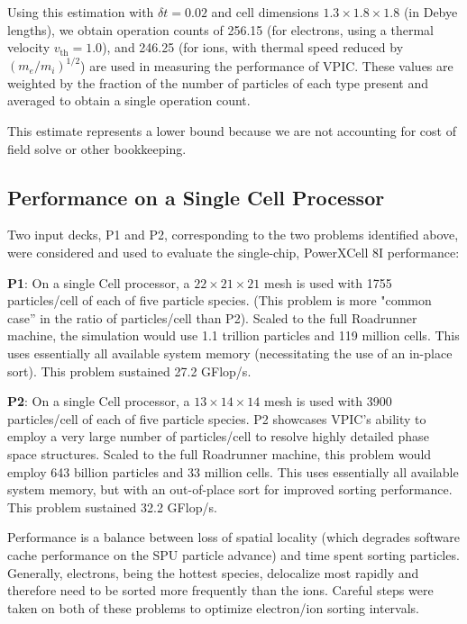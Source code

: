 \documentclass[letter,10pt]{article}
\begin{document}
Using this estimation with $\delta t = 0.02$ and cell dimensions $1.3
\times 1.8 \times 1.8$ (in Debye lengths), we obtain operation counts
of 256.15 (for electrons, using a thermal velocity $v_{\mathrm{th}} =
1.0$), and 246.25 (for ions, with thermal speed reduced by
$(m_e/m_i)^{1/2}$) are used in measuring the performance of VPIC.
These values are weighted by the fraction of the number of particles
of each type present and averaged to obtain a single operation count.

This estimate represents a lower bound because we are not accounting
for cost of field solve or other bookkeeping. 

\subsection{Performance on a Single Cell Processor}

Two input decks, P1 and P2, corresponding to the two problems
identified above, were considered and used to evaluate the
single-chip, PowerXCell 8I performance:

\textbf{P1}:  On a single Cell processor, a $22 \times 21 \times 21$ mesh 
is used with 1755 particles/cell of each of five particle species.
(This problem is more "common case'' in the ratio of particles/cell
than P2).  Scaled to the full Roadrunner machine, the simulation would
use 1.1 trillion particles and 119 million cells.  This uses
essentially all available system memory (necessitating the use of an
in-place sort).  This problem sustained 27.2 GFlop/s.

\textbf{P2}:  On a single Cell processor, a $13 \times 14 \times 14$ mesh 
is used with 3900 particles/cell of each of five particle species.  P2
showcases VPIC's ability to employ a very large number of
particles/cell to resolve highly detailed phase space structures.
Scaled to the full Roadrunner machine, this problem would employ 643
billion particles and 33 million cells. This uses essentially all
available system memory, but with an out-of-place sort for improved
sorting performance.  This problem sustained 32.2 GFlop/s.

Performance is a balance between loss of spatial locality (which
degrades software cache performance on the SPU particle advance) and
time spent sorting particles.  Generally, electrons, being the hottest
species, delocalize most rapidly and therefore need to be sorted more
frequently than the ions.  Careful steps were taken on both of these
problems to optimize electron/ion sorting intervals.
\end{document}
